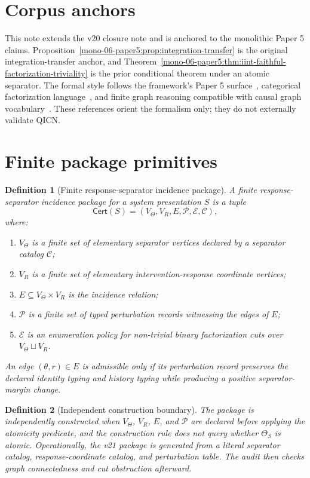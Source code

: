 \documentclass[11pt]{article}
\newtheorem{definition}{Definition}[section]
\newcommand{\VTheta}{V_{\Theta}}
\newcommand{\VR}{V_R}
\newcommand{\Cert}{\mathsf{Cert}}
\begin{document}
\section{Corpus anchors}
This note extends the v20 closure note and is anchored to the monolithic Paper 5 claims. Proposition~\ref{mono-06-paper5:prop:integration-transfer} is the original integration-transfer anchor, and Theorem~\ref{mono-06-paper5:thm:iint-faithful-factorization-triviality} is the prior conditional theorem under an atomic separator. The formal style follows the framework's Paper 5 surface~\cite{paper5}, categorical factorization language~\cite{maclane1998}, and finite graph reasoning compatible with causal graph vocabulary~\cite{pearl2009}. These references orient the formalism only; they do not externally validate QICN.

\section{Finite package primitives}

\begin{definition}[Finite response-separator incidence package]
A finite response-separator incidence package for a system presentation $S$ is a tuple
\[
  \Cert(S)=(\VTheta,\VR,E,\mathcal P,\mathcal E,\mathcal C),
\]
where:
\begin{enumerate}[label=(\roman*)]
  \item $\VTheta$ is a finite set of elementary separator vertices declared by a separator catalog $\mathcal C$;
  \item $\VR$ is a finite set of elementary intervention-response coordinate vertices;
  \item $E\subseteq \VTheta\times\VR$ is the incidence relation;
  \item $\mathcal P$ is a finite set of typed perturbation records witnessing the edges of $E$;
  \item $\mathcal E$ is an enumeration policy for non-trivial binary factorization cuts over $\VTheta\sqcup\VR$.
\end{enumerate}
An edge $(\theta,r)\in E$ is admissible only if its perturbation record preserves the declared identity typing and history typing while producing a positive separator-margin change.
\end{definition}

\begin{definition}[Independent construction boundary]
The package is independently constructed when $\VTheta$, $\VR$, $E$, and $\mathcal P$ are declared before applying the atomicity predicate, and the construction rule does not query whether $\Theta_S$ is atomic. Operationally, the v21 package is generated from a literal separator catalog, response-coordinate catalog, and perturbation table. The audit then checks graph connectedness and cut obstruction afterward.
\end{definition}
\end{document}
